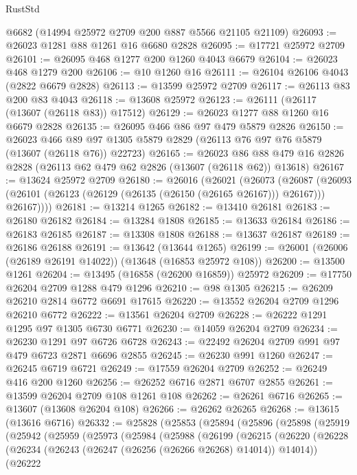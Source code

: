 \begin{lexlean}{RustStd}
\begin{coremodule}
    @6682
    (@14994 @25972 @2709 @200 @887 @5566 @21105 @21109)
@26093 := @26023 @1281 @88 @1261 @16 @6680 @2828
@26095 := @17721 @25972 @2709
@26101 := @26095 @468 @1277 @200 @1260 @4043 @6679
@26104 := @26023 @468 @1279 @200
@26106 := @10 @1260 @16
@26111 := @26104 @26106 @4043 (@2822 @6679 @2828)
@26113 := @13599 @25972 @2709
@26117 := @26113 @83 @200 @83 @4043
@26118 := @13608 @25972
@26123 := @26111 (@26117 (@13607 (@26118 @83)) @17512)
@26129 := @26023 @1277 @88 @1260 @16 @6679 @2828
@26135 := @26095 @466 @86 @97 @479 @5879 @2826
@26150 := @26023
    @466
    @89
    @97
    @1305
    @5879
    @2829
    (@26113 @76 @97 @76 @5879 (@13607 (@26118 @76)) @22723)
@26165 := @26023
    @86
    @88
    @479
    @16
    @2826
    @2828
    (@26113 @62 @479 @62 @2826 (@13607 (@26118 @62)) @13618)
@26167 := @13624 @25972 @2709
@26180 := @26016
    (@26021
      (@26073
        (@26087
          (@26093 (@26101 (@26123 (@26129 (@26135 (@26150 (@26165 @26167))) @26167))) @26167))))
@26181 := @13214 @1265
@26182 := @13410 @26181
@26183 := @26180 @26182
@26184 := @13284 @1808
@26185 := @13633 @26184
@26186 := @26183 @26185
@26187 := @13308 @1808
@26188 := @13637 @26187
@26189 := @26186 @26188
@26191 := @13642 (@13644 @1265)
@26199 := @26001 (@26006 (@26189 @26191 @14022)) (@13648 (@16853 @25972 @108))
@26200 := @13500 @1261
@26204 := @13495 (@16858 (@26200 @16859)) @25972
@26209 := @17750 @26204 @2709 @1288 @479 @1296
@26210 := @98 @1305
@26215 := @26209 @26210 @2814 @6772 @6691 @17615
@26220 := @13552 @26204 @2709 @1296 @26210 @6772
@26222 := @13561 @26204 @2709
@26228 := @26222 @1291 @1295 @97 @1305 @6730 @6771
@26230 := @14059 @26204 @2709
@26234 := @26230 @1291 @97 @6726 @6728
@26243 := @22492 @26204 @2709 @991 @97 @479 @6723 @2871 @6696 @2855
@26245 := @26230 @991 @1260
@26247 := @26245 @6719 @6721
@26249 := @17559 @26204 @2709
@26252 := @26249 @416 @200 @1260
@26256 := @26252 @6716 @2871 @6707 @2855
@26261 := @13599 @26204 @2709 @108 @1261 @108
@26262 := @26261 @6716
@26265 := @13607 (@13608 @26204 @108)
@26266 := @26262 @26265
@26268 := @13615 (@13616 @6716)
@26332 := @25828
    (@25853
      (@25894
        (@25896
          (@25898
            (@25919
              (@25942
                (@25959
                  (@25973
                    (@25984
                      (@25988
                        (@26199
                          (@26215
                            (@26220
                              (@26228
                                (@26234 (@26243 (@26247 (@26256 (@26266 @26268) @14014)) @14014))
                                (@26222

\end{coremodule}
\end{lexlean}
